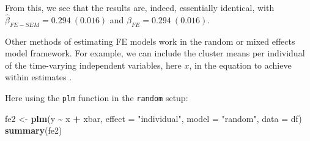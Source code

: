 \documentclass[]{interact}
\theoremstyle{plain}%
\theoremstyle{definition}
\theoremstyle{remark}
\newenvironment{Shaded}{\begin{snugshade}}{\end{snugshade}}
\newcommand{\CommentTok}[1]{\textcolor[rgb]{0.56,0.35,0.01}{\textit{#1}}}
\newcommand{\DataTypeTok}[1]{\textcolor[rgb]{0.13,0.29,0.53}{#1}}
\newcommand{\KeywordTok}[1]{\textcolor[rgb]{0.13,0.29,0.53}{\textbf{#1}}}
\newcommand{\NormalTok}[1]{#1}
\newcommand{\OperatorTok}[1]{\textcolor[rgb]{0.81,0.36,0.00}{\textbf{#1}}}
\newcommand{\StringTok}[1]{\textcolor[rgb]{0.31,0.60,0.02}{#1}}
\begin{document}
\doublespacing

From this, we see that the results are, indeed, essentially identical,
with \(\hat{\beta}_{FE-SEM} =0.294 \ (0.016)\) and
\(\hat{\beta}_{FE} = 0.294 \ (0.016)\).

Other methods of estimating FE models work in the random or mixed
effects model framework. For example, we can include the cluster means
per individual of the time-varying independent variables, here \(x\), in
the equation to achieve within estimates
\citep{Mundlak1978, Chamberlain1980, Wooldridge2002}.

\singlespacing

\begin{Shaded}
\end{Shaded}

\doublespacing

Here using the \texttt{plm} function in the \texttt{random} setup:

\singlespacing

\begin{Shaded}
\begin{Highlighting}[]
\NormalTok{fe2 \textless{}{-}}\StringTok{ }\KeywordTok{plm}\NormalTok{(y }\OperatorTok{\textasciitilde{}}\StringTok{ }\NormalTok{x }\OperatorTok{+}\StringTok{ }\NormalTok{xbar, }
           \DataTypeTok{effect =} \StringTok{"individual"}\NormalTok{, }\DataTypeTok{model =} \StringTok{"random"}\NormalTok{,}
           \DataTypeTok{data =}\NormalTok{ df)}
\KeywordTok{summary}\NormalTok{(fe2)}
\end{Highlighting}
\end{Shaded}
\end{document}
